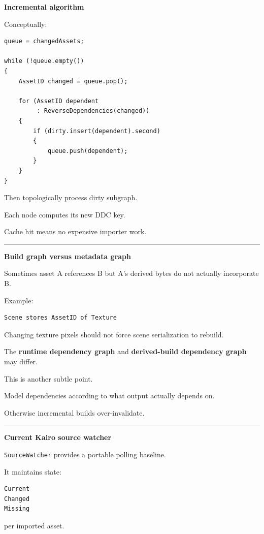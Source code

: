 \textbf{Incremental algorithm}

Conceptually:

\begin{verbatim}
queue = changedAssets;

while (!queue.empty())
{
    AssetID changed = queue.pop();

    for (AssetID dependent
         : ReverseDependencies(changed))
    {
        if (dirty.insert(dependent).second)
        {
            queue.push(dependent);
        }
    }
}
\end{verbatim}

Then topologically process dirty subgraph.

Each node computes its new DDC key.

Cache hit means no expensive importer work.

\begin{center}\rule{0.5\linewidth}{0.5pt}\end{center}

\textbf{Build graph versus metadata graph}

Sometimes asset A references B but A's derived bytes do not actually incorporate B.

Example:

\begin{verbatim}
Scene stores AssetID of Texture
\end{verbatim}

Changing texture pixels should not force scene serialization to rebuild.

The \textbf{runtime dependency graph} and \textbf{derived-build dependency graph} may differ.

This is another subtle point.

Model dependencies according to what output actually depends on.

Otherwise incremental builds over-invalidate.

\begin{center}\rule{0.5\linewidth}{0.5pt}\end{center}

\textbf{Current Kairo source watcher}

\texttt{SourceWatcher} provides a portable polling baseline.

It maintains state:

\begin{verbatim}
Current
Changed
Missing
\end{verbatim}

per imported asset.

